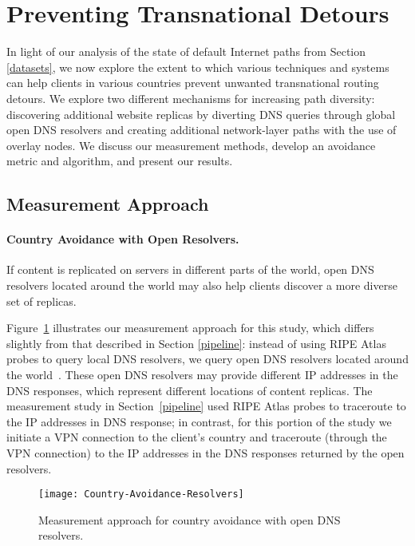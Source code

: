 \section{Preventing Transnational Detours}
\label{avoid_results}

In light of our analysis of the state of default Internet paths from
Section \ref{datasets}, we now explore the extent to which various
techniques and systems can help clients in various countries prevent
unwanted transnational routing detours. We explore two different
mechanisms for increasing path diversity: discovering additional website
replicas by diverting DNS queries through global open DNS resolvers and
creating additional network-layer paths with the use of overlay nodes.
We discuss our measurement methods, develop an avoidance metric and
algorithm, and present our results.

\subsection{Measurement Approach}
\label{avoid_pipelines}

\paragraph{Country Avoidance with Open Resolvers.} If content is
replicated on servers in different parts of the world, open DNS
resolvers located 
around the world may also help clients discover a more diverse set of
replicas.  

Figure~\ref{fig:avoidance_resolvers} illustrates our measurement
approach for this study, which differs slightly from that described in
Section \ref{pipeline}: instead of using RIPE Atlas probes to query
local DNS resolvers, we query open DNS resolvers located around the
world~\cite{open_resolver_list}.  These open DNS resolvers may provide
different IP addresses in the DNS responses, which represent different
locations of content replicas. The measurement study in
Section~\ref{pipeline} used RIPE Atlas probes to traceroute to the IP
addresses in DNS response; in contrast, for this portion of the study we
initiate a VPN connection to the client's country and traceroute
(through the VPN connection) to the IP addresses in the DNS responses
returned by the open resolvers.

\begin{figure}[t]
\centering
\texttt{[image: Country-Avoidance-Resolvers]}
\caption{Measurement approach for country avoidance with open DNS resolvers.}
\label{fig:avoidance_resolvers}
\end{figure}

